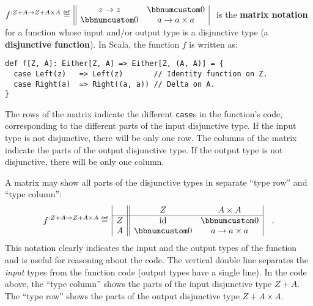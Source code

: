 $f^{:Z+A\rightarrow Z+A\times A}\triangleq\,\begin{array}{||cc|}
z\rightarrow z & \bbnum 0\\
\bbnum 0 & a\rightarrow a\times a
\end{array}\,\,$ is the \textbf{matrix notation} for a function
whose input and/or output type is a disjunctive type (a
\textbf{disjunctive function}). In Scala, the function $f$ is written
as:
\begin{lstlisting}
def f[Z, A]: Either[Z, A] => Either[Z, (A, A)] = {
  case Left(z)   => Left(z)       // Identity function on Z.
  case Right(a)  => Right((a, a)) // Delta on A.
}
\end{lstlisting}
The rows of the matrix indicate the different \lstinline!case!s in
the function\textsf{'}s code, corresponding to the different parts of the input
disjunctive type. If the input type is not disjunctive, there will
be only one row. The columns of the matrix indicate the parts of the
output disjunctive type. If the output type is not disjunctive, there
will be only one column.

A matrix may show all parts of the disjunctive types in separate \textsf{``}type
row\textsf{''} and \textsf{``}type column\textsf{''}:
\begin{equation}
f^{:Z+A\rightarrow Z+A\times A}\triangleq\,\begin{array}{|c||cc|}
 & Z & A\times A\\
\hline Z & \text{id} & \bbnum 0\\
A & \bbnum 0 & a\rightarrow a\times a
\end{array}\quad.
\end{equation}
This notation clearly indicates the input and the output types of
the function and is useful for reasoning about the code. The vertical
double line separates the \emph{input} types from the function code
(output types have a single line). In the code above, the \textsf{``}type
column\textsf{''} shows the parts of the input disjunctive type $Z+A$. The
\textsf{``}type row\textsf{''} shows the parts of the output disjunctive type $Z+A\times A$.

